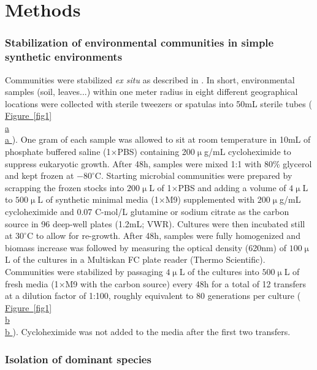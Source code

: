 \documentclass[a4paper,10pt]{article}
\newcommand{\figref}[2][]{%
  \hyperref[{#2}]{%
    Figure~\ref*{#2}%
    \ifx\\#1\\%
    \else
      #1%
    \fi
  }%
}
\begin{document}
\clearpage











\section*{Methods}\label{methods}

\subsubsection*{Stabilization of environmental communities in simple synthetic environments}
\label{methods:community-assembly}

Communities were stabilized \textit{ex situ} as described in \cite{Goldford2018}.
In short, environmental samples (soil, leaves...) within one meter radius in eight different
geographical locations were collected with sterile
tweezers or spatulas into 50mL sterile tubes (\figref[a]{fig1}).
One gram of each sample was allowed to
sit at room temperature in 10mL of phosphate buffered saline (1$\times$PBS) containing
200$\upmu$g/mL cycloheximide to suppress eukaryotic growth.
After 48h, samples were mixed 1:1 with 80\% glycerol and kept frozen at $-80^\circ$C.
Starting microbial communities were prepared by scrapping the frozen stocks into
$200\upmu$L of 1$\times$PBS and adding a volume of $4\upmu$L to $500\upmu$L
of synthetic minimal media (1$\times$M9) supplemented with $200\upmu$g/mL cycloheximide
and 0.07 C-mol/L glutamine or sodium citrate as the carbon source in 96 deep-well plates
(1.2mL; VWR).
Cultures were then incubated still at $30^\circ$C to allow for re-growth.
After 48h, samples were fully homogenized and biomass increase was followed by measuring
the optical density (620nm) of $100\upmu$L of the cultures in a Multiskan FC plate reader
(Thermo Scientific).
Communities were stabilized \cite{Goldford2018} by passaging $4\upmu$L of the cultures into
$500\upmu$L of fresh media (1$\times$M9 with the carbon source)  every 48h for a total of
12 transfers at a dilution factor of 1:100,
roughly equivalent to 80 generations per culture (\figref[b]{fig1}).
Cycloheximide was not added to the media after the first two transfers.

\subsubsection*{Isolation of dominant species}\label{methods:dominants}
\end{document}
